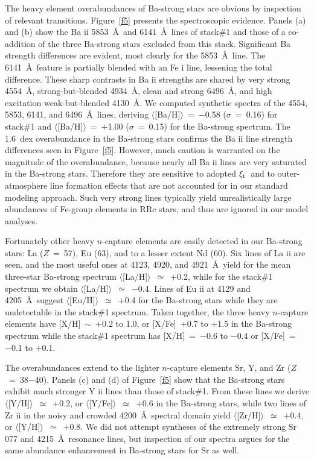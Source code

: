 \documentclass[preprint]{aastex6}
\newcommand\species[2]{#1 {\sc #2}}
\def\vmicro{\mbox{$\xi_{\rm t}$}}
\begin{document}
The heavy element overabundances of Ba-strong stars are obvious by 
inspection of relevant transitions. 
Figure~\ref{f5} presents the spectroscopic evidence. 
Panels (a) and (b) show the \species{Ba}{ii} 5853~\AA\ and 6141~\AA\ lines of 
stack\#1 and those of a co-addition of the three Ba-strong stars excluded 
from this stack.  
Significant Ba strength differences are evident, most
clearly for the 5853~\AA\ line.
The 6141~\AA\ feature is partially blended with an \species{Fe}{i} line,
lessening the total difference.
These sharp contrasts in \species{Ba}{ii} strengths 
are shared by very strong 4554~\AA, strong-but-blended 4934~\AA, 
clean and strong 6496~\AA, and high excitation weak-but-blended 4130~\AA.
We computed synthetic spectra of the 4554, 5853, 6141, and 6496~\AA\ lines,
deriving $\langle$[Ba/H]$\rangle$~=~$-$0.58 ($\sigma$~=~0.16) for stack\#1 and
$\langle$[Ba/H]$\rangle$~=~$+$1.00 ($\sigma$~=~0.15) for the Ba-strong spectrum.
The 1.6~dex overabundance in the Ba-strong stars confirms the \species{Ba}{ii}
line strength differences seen in Figure~\ref{f5}.
However, much caution is warranted on the magnitude of the overabundance, 
because nearly all \species{Ba}{ii} lines are very 
saturated in the Ba-strong stars. 
Therefore they are sensitive to adopted \vmicro\ and to outer-atmosphere 
line formation effects that are not accounted for in our standard 
modeling approach.
Such very strong lines typically yield unrealistically large abundances
of Fe-group elements in RRc stars, and thus are ignored in our model analyses.

Fortunately other heavy $n$-capture elements are easily detected in our
Ba-strong stars: La ($Z$~=~57), Eu (63), and to a lesser extent Nd (60).
Six lines of \species{La}{ii} are seen, and the most useful ones at 
4123, 4920, and 4921~\AA\ yield for the mean three-star Ba-strong spectrum 
$\langle$[La/H]$\rangle$~$\simeq$~$+$0.2, while for the stack\#1 spectrum 
we obtain $\langle$[La/H]$\rangle$~$\simeq$~$-$0.4.
Lines of \species{Eu}{ii} at 4129 and 4205~\AA\ suggest
$\langle$[Eu/H]$\rangle$~$\simeq$~$+$0.4 for the Ba-strong stars while
they are undetectable in the stack\#1 spectrum.
Taken together, the three heavy $n$-capture elements have 
[X/H]~$\sim$~$+$0.2 to 1.0,
or [X/Fe]~$+$0.7 to $+$1.5 in the Ba-strong spectrum while the stack\#1 
spectrum has [X/H]~=~$-$0.6 to $-$0.4 or [X/Fe]~=~~$-$0.1 to $+$0.1.

The overabundances extend to the lighter $n$-capture elements Sr, Y, and Zr 
($Z$~=~38$-$40).
Panels (c) and (d) of Figure~\ref{f5} show that the Ba-strong stars 
exhibit much stronger \species{Y}{ii} lines than those of stack\#1.
From these lines we derive $\langle$[Y/H]$\rangle$~$\simeq$~$+$0.2, or
$\langle$[Y/Fe]$\rangle$~$\simeq$~$+$0.6 in the Ba-strong stars, while
two lines of \species{Zr}{ii} in the noisy and crowded 4200~\AA\ spectral
domain yield $\langle$[Zr/H]$\rangle$~$\simeq$~$+$0.4, or
$\langle$[Y/H]$\rangle$~$\simeq$~$+$0.8.
We did not attempt syntheses of the extremely strong \species{Sr} 4077 
and 4215~\AA\ resonance lines, but inspection of our spectra argues for
the same abundance enhancement in Ba-strong stars for Sr as well.
\end{document}
